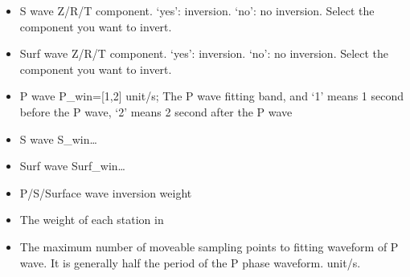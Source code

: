 \documentclass[a4paper,10pt,english,openany]{sphinxmanual}
\begin{document}
\begin{itemize}
\item {} 
S wave Z/R/T component. ‘yes’: inversion. ‘no’: no inversion. Select the component you want to invert.

\end{itemize}

\begin{itemize}
\item {} 
Surf wave Z/R/T component. ‘yes’: inversion. ‘no’: no inversion. Select the component you want to invert.

\end{itemize}

\begin{itemize}
\item {} 
P wave P\_win={[}\sphinxhyphen{}1,2{]} unit/s; The P wave fitting band, and ‘\sphinxhyphen{}1’ means 1 second before the P wave, ‘2’ means 2 second after the P wave

\end{itemize}

\begin{itemize}
\item {} 
S wave S\_win…

\end{itemize}

\begin{itemize}
\item {} 
Surf wave Surf\_win…

\end{itemize}

\begin{itemize}
\item {} 
P/S/Surface wave inversion weight

\end{itemize}

\begin{itemize}
\item {} 
The weight of each station in 

\end{itemize}

\begin{itemize}
\item {} 
The maximum number of moveable sampling points to fitting waveform of P wave.
It is generally half the period of the P phase waveform. unit/s.

\end{itemize}
\end{document}
